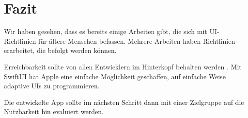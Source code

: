 \chapter{Fazit}

Wir haben gesehen, dass es bereits einige Arbeiten gibt, die sich mit UI-Richtlinien für ältere Menschen befassen. Mehrere Arbeiten haben Richtlinien erarbeitet, die befolgt werden können.

Erreichbarkeit sollte von allen Entwicklern im Hinterkopf behalten werden \cite{Diaz-Bossini:2014:Accessibility-to-Mobile-Interfaces}. Mit SwiftUI hat Apple eine einfache Möglichkeit geschaffen, auf einfache Weise adaptive UIs zu programmieren.

Die entwickelte App sollte im nächsten Schritt dann mit einer Zielgruppe auf die Nutzbarkeit hin evaluiert werden.